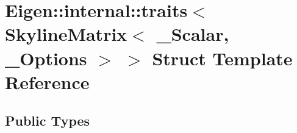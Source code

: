 \hypertarget{struct_eigen_1_1internal_1_1traits_3_01_skyline_matrix_3_01___scalar_00_01___options_01_4_01_4}{}\section{Eigen\+:\+:internal\+:\+:traits$<$ Skyline\+Matrix$<$ \+\_\+\+Scalar, \+\_\+\+Options $>$ $>$ Struct Template Reference}
\label{struct_eigen_1_1internal_1_1traits_3_01_skyline_matrix_3_01___scalar_00_01___options_01_4_01_4}
\subsection*{Public Types}
